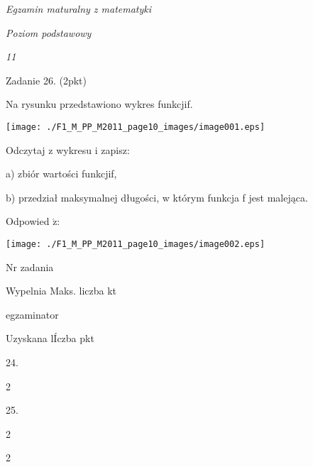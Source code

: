\documentclass[a4paper,12pt]{article}
\begin{document}
{\it Egzamin maturalny z matematyki}

{\it Poziom podstawowy}

{\it 11}

Zadanie 26. (2pkt)

Na rysunku przedstawiono wykres funkcjif.
\begin{center}
\texttt{[image: ./F1\_M\_PP\_M2011\_page10\_images/image001.eps]}
\end{center}
Odczytaj z wykresu i zapisz:

a) zbiór wartości funkcjif,

b) przedział maksymalnej długości, w którym funkcja f jest malejąca.

Odpowied $\acute{\mathrm{z}}$:
\begin{center}
\texttt{[image: ./F1\_M\_PP\_M2011\_page10\_images/image002.eps]}
\end{center}
Nr zadania

Wypelnia Maks. liczba kt

egzaminator

Uzyskana lÍczba pkt

24.

2

25.

2

2
\end{document}
